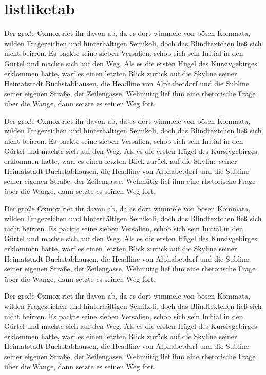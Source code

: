 \documentclass[%
	12pt,%
	a4paper,%
	oneside,%
	listof=totoc,
 	index=totoc,
	bibliography = totoc,
	parskip = half,%
	chapterprefix=false,%
	appendixprefix, %
	headings=small,%
]{scrreprt}
\begin{document}
\chapter{listliketab}
Der große Oxmox riet ihr davon ab, da es dort wimmele von bösen Kommata, wilden Fragezeichen und hinterhältigen Semikoli, doch das Blindtextchen ließ sich nicht beirren. Es packte seine sieben Versalien, schob sich sein Initial in den Gürtel und machte sich auf den Weg. Als es die ersten Hügel des Kursivgebirges erklommen hatte, warf es einen letzten Blick zurück auf die Skyline seiner Heimatstadt Buchstabhausen, die Headline von Alphabetdorf und die Subline seiner eigenen Straße, der Zeilengasse. Wehmütig lief ihm eine rhetorische Frage über die Wange, dann setzte es seinen Weg fort.

Der große Oxmox riet ihr davon ab, da es dort wimmele von bösen Kommata, wilden Fragezeichen und hinterhältigen Semikoli, doch das Blindtextchen ließ sich nicht beirren. Es packte seine sieben Versalien, schob sich sein Initial in den Gürtel und machte sich auf den Weg. Als es die ersten Hügel des Kursivgebirges erklommen hatte, warf es einen letzten Blick zurück auf die Skyline seiner Heimatstadt Buchstabhausen, die Headline von Alphabetdorf und die Subline seiner eigenen Straße, der Zeilengasse. Wehmütig lief ihm eine rhetorische Frage über die Wange, dann setzte es seinen Weg fort.

Der große Oxmox riet ihr davon ab, da es dort wimmele von bösen Kommata, wilden 	Fragezeichen und hinterhältigen Semikoli, doch das Blindtextchen ließ sich nicht beirren. Es packte seine sieben Versalien, schob sich sein Initial in den Gürtel und machte sich auf den Weg. Als es die ersten Hügel des Kursivgebirges erklommen hatte, warf es einen letzten Blick zurück auf die Skyline seiner Heimatstadt Buchstabhausen, die Headline von Alphabetdorf und die Subline seiner eigenen Straße, der Zeilengasse. Wehmütig lief ihm eine rhetorische Frage über die Wange, dann setzte es seinen Weg fort.

Der große Oxmox riet ihr davon ab, da es dort wimmele von bösen Kommata, wilden Fragezeichen und hinterhältigen Semikoli, doch das Blindtextchen ließ sich nicht beirren. Es packte seine sieben Versalien, schob sich sein Initial in den Gürtel und machte sich auf den Weg. Als es die ersten Hügel des Kursivgebirges erklommen hatte, warf es einen letzten Blick zurück auf die Skyline seiner Heimatstadt Buchstabhausen, die Headline von Alphabetdorf und die Subline seiner eigenen Straße, der Zeilengasse. Wehmütig lief ihm eine rhetorische Frage über die Wange, dann setzte es seinen Weg fort.
\end{document}

